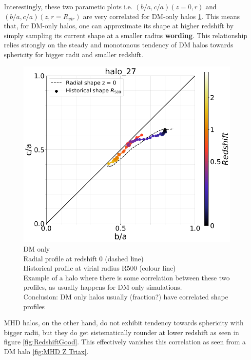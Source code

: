 \documentclass[a4paper,fleqn,usenatbib]{mnras}
\begin{document}
Interestingly, these two parametic plots i.e. $(b/a,c/a)(z=0,r)$ and
$(b/a,c/a)(z,r=R_{vir})$ are very correlated for DM-only halos
\ref{fig:DM Z Triax}. This means that, for DM-only halos, one can
approximate its shape at higher redshift by simply sampling its
current shape at a smaller radius \textbf{wording}. This relationship
relies strongly on the steady and monotonous tendency of DM halos
towards sphericity for bigger radii and smaller redshift. 


\begin{figure}
	\includegraphics[width=\columnwidth]{./pics/Redshift/halo_27_DM_Z_correlation.png}
    \caption{DM only\\
    		 Radial profile at redshift 0 (dashed line)\\
    		 Historical profile at virial radius R500 (colour line)\\
    		 Example of a halo where there is some correlation between these two profiles, as usually happens for DM only simulations.\\
    		 Conclusion: DM only halos usually (fraction?) have correlated shape profiles 
    		 }
    \label{fig:DM Z Triax}
    
\end{figure}

MHD halos, on the other hand, do not exhibit tendency towards
sphericity with bigger radii, but they do get sistematically rounder
at lower redshift as seen in figure \ref{fig:RedshiftGood}. This
effectively vanishes this correlation as seen from a DM halo
\ref{fig:MHD Z Triax}. 
\end{document}
